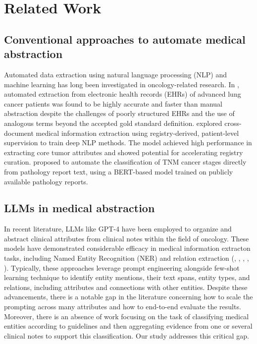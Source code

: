 \section{Related Work} 





\subsection{Conventional approaches to automate medical abstraction}
Automated data extraction using natural language processing (NLP) and machine learning has long been investigated in oncology-related research. In \citet{Gauthier2022-wk}, automated extraction from electronic health records (EHRs) of advanced lung cancer patients was found to be highly accurate and faster than manual abstraction despite the challenges of poorly structured EHRs and the use of analogous terms beyond the accepted gold standard definition. \cite{Preston2023-wb} explored cross-document medical information extraction using registry-derived, patient-level supervision to train deep NLP methods. The model achieved high performance in extracting core tumor attributes and showed potential for accelerating registry curation. \citet{kefeli2024generalizable} proposed to automate the classification of TNM cancer stages directly from pathology report text, using a BERT-based model trained on publicly available pathology reports.






\subsection{LLMs in medical abstraction}
In recent literature, LLMs like GPT-4 have been employed to organize and abstract clinical attributes from clinical notes within the field of oncology. These models have demonstrated considerable efficacy in medical information extracton tasks, including Named Entity Recognition (NER) and relation extraction (\cite{zhou2024universalner}, \cite{bhattarai2024leveraging}, \cite{goel2023llms}, \cite{10.1093/jamia/ocad259}, \citep{wong2023scaling}).
 Typically, these approaches leverage prompt engineering alongside few-shot learning technique to identify entity mentions, their text spans, entity types, and relations, including attributes and connections with other entities. Despite these advancements, there is a notable gap in the literature concerning how to scale the prompting across many attributes and how to end-to-end evaluate the results.
 Moreover, there is an absence of work focusing on the task of classifying medical entities according to guidelines and then aggregating evidence from one or several clinical notes to support this classification. Our study addresses this critical gap. 
